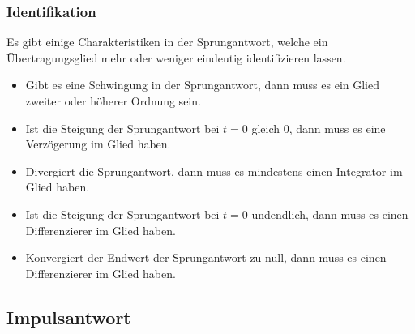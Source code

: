 \subsubsection{Identifikation}
Es gibt einige Charakteristiken in der Sprungantwort, welche ein
Übertragungsglied mehr oder weniger eindeutig identifizieren lassen.

\begin{itemize}
    \item Gibt es eine Schwingung in der Sprungantwort, dann muss es 
        ein Glied zweiter oder höherer Ordnung sein.
    \item Ist die Steigung der Sprungantwort bei $t=0$ gleich $0$, dann
        muss es eine Verzögerung im Glied haben.
    \item Divergiert die Sprungantwort, dann muss es mindestens einen
        Integrator im Glied haben. 
    \item Ist die Steigung der Sprungantwort bei $t=0$ undendlich, dann
        muss es einen Differenzierer im Glied haben.
    \item Konvergiert der Endwert der Sprungantwort zu null, dann muss
        es einen Differenzierer im Glied haben.
\end{itemize}

\subsection{Impulsantwort}

